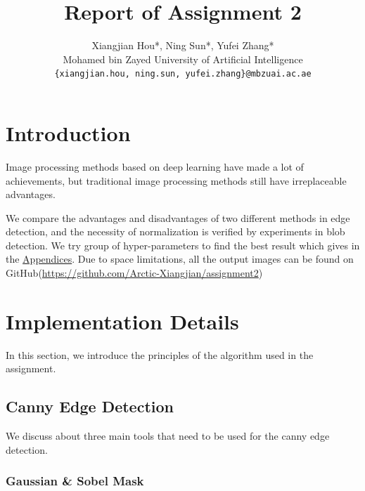 \documentclass[final]{cvpr}
\begin{document}
\title{Report of Assignment 2}

\author{Xiangjian Hou*, Ning Sun*, Yufei Zhang*\\
Mohamed bin Zayed University of Artificial Intelligence\\
{\tt\small \{xiangjian.hou, ning.sun, yufei.zhang\}@mbzuai.ac.ae}
}

\maketitle



\section{Introduction}
Image processing methods based on deep learning have made a lot of achievements, but traditional image processing methods still have irreplaceable advantages.

We compare the advantages and disadvantages of two different methods in edge detection, and the necessity of normalization is verified by experiments in blob detection. We try group of hyper-parameters to find the best result which gives in the \hyperref[append]{Appendices}. Due to space limitations, all the output images can be found on GitHub(\href{https://github.com/Arctic-Xiangjian/assignment2}{https://github.com/Arctic-Xiangjian/assignment2})


\section{Implementation Details}

In this section, we introduce the principles of the algorithm used in the assignment.
\subsection{Canny Edge Detection}
We discuss about three main tools that need to be used for the canny edge detection.


\subsubsection{Gaussian \& Sobel Mask}
\end{document}

